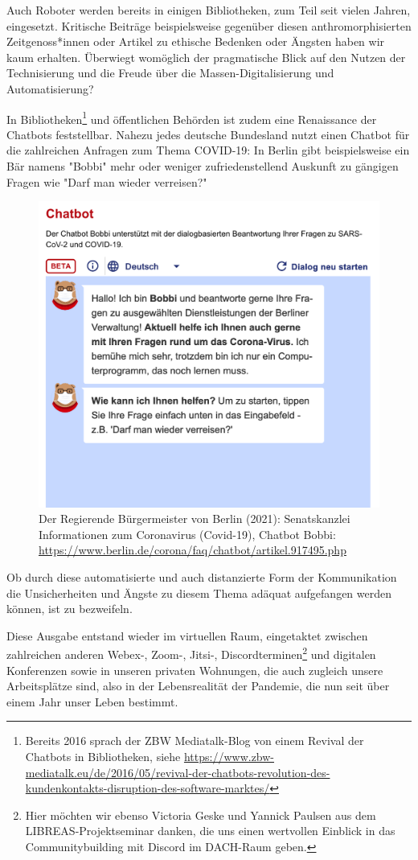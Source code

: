 \documentclass[a4paper,
fontsize=11pt,
oneside,
numbers=noperiodatend,
parskip=half-,
bibliography=totoc,
final
]{scrartcl}
\begin{document}
Auch Roboter werden bereits in einigen Bibliotheken, zum Teil seit
vielen Jahren, eingesetzt. Kritische Beiträge beispielsweise gegenüber
diesen anthromorphisierten Zeitgenoss*innen oder Artikel zu ethische
Bedenken oder Ängsten haben wir kaum erhalten. Überwiegt womöglich der
pragmatische Blick auf den Nutzen der Technisierung und die Freude über
die Massen-Digitalisierung und Automatisierung?

In Bibliotheken\footnote{Bereits 2016 sprach der ZBW Mediatalk-Blog von
  einem Revival der Chatbots in Bibliotheken, siehe
  \url{https://www.zbw-mediatalk.eu/de/2016/05/revival-der-chatbots-revolution-des-kundenkontakts-disruption-des-software-marktes/}}
und öffentlichen Behörden ist zudem eine Renaissance der Chatbots
feststellbar. Nahezu jedes deutsche Bundesland nutzt einen Chatbot für
die zahlreichen Anfragen zum Thema COVID-19: In Berlin gibt
beispielsweise ein Bär namens "Bobbi" mehr oder weniger
zufriedenstellend Auskunft zu gängigen Fragen wie "Darf man wieder
verreisen?"

\begin{figure}
\centering
\includegraphics[width=.6\textwidth]{img/img1}
\caption{Der Regierende Bürgermeister von Berlin (2021): Senatskanzlei
Informationen zum Coronavirus (Covid-19), Chatbot Bobbi:
\url{https://www.berlin.de/corona/faq/chatbot/artikel.917495.php}}
\end{figure}

Ob durch diese automatisierte und auch distanzierte Form der
Kommunikation die Unsicherheiten und Ängste zu diesem Thema adäquat
aufgefangen werden können, ist zu bezweifeln.

Diese Ausgabe entstand wieder im virtuellen Raum, eingetaktet zwischen
zahlreichen anderen Webex-, Zoom-, Jitsi-, Discordterminen\footnote{Hier
  möchten wir ebenso Victoria Geske und Yannick Paulsen aus dem
  LIBREAS-Projektseminar danken, die uns einen wertvollen Einblick in
  das Communitybuilding mit Discord im DACH-Raum geben.} und digitalen
Konferenzen sowie in unseren privaten Wohnungen, die auch zugleich
unsere Arbeitsplätze sind, also in der Lebensrealität der Pandemie, die
nun seit über einem Jahr unser Leben bestimmt.
\end{document}
